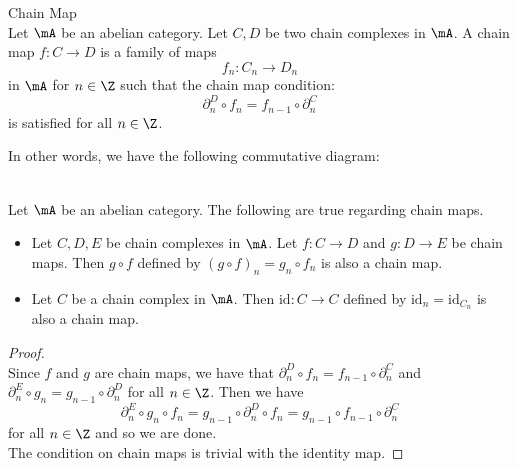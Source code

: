 \documentclass[a4paper]{article}
\begin{document}
\begin{defn}{Chain Map}{}\\
Let $\mA$ be an abelian category. Let $C,D$ be two chain complexes in $\mA$. A chain map $f:C\to D$ is a family of maps $$f_n:C_n\to D_n$$ in $\mA$ for $n\in\Z$ such that the chain map condition: $$\partial_n^D\circ f_n=f_{n-1}\circ\partial_n^C$$ is satisfied for all $n\in\Z$. 
\end{defn}

In other words, we have the following commutative diagram: \\

\begin{lmm}{}{}\\
Let $\mA$ be an abelian category. The following are true regarding chain maps. 
\begin{itemize}
\item Let $C,D,E$ be chain complexes in $\mA$. Let $f:C\to D$ and $g:D\to E$ be chain maps. Then $g\circ f$ defined by $(g\circ f)_n=g_n\circ f_n$ is also a chain map. 
\item Let $C$ be a chain complex in $\mA$. Then $\text{id}:C\to C$ defined by $\text{id}_n=\text{id}_{C_n}$ is also a chain map. 
\end{itemize}
\begin{proof}\\
Since $f$ and $g$ are chain maps, we have that $\partial_n^D\circ f_n=f_{n-1}\circ\partial_n^C$ and $\partial_n^E\circ g_n=g_{n-1}\circ\partial_n^D$ for all $n\in\Z$. Then we have $$\partial_n^E\circ g_n\circ f_n=g_{n-1}\circ\partial_n^D\circ f_n=g_{n-1}\circ f_{n-1}\circ\partial_n^C$$ for all $n\in\Z$ and so we are done. \\

The condition on chain maps is trivial with the identity map. 
\end{proof}
\end{lmm}
\end{document}

